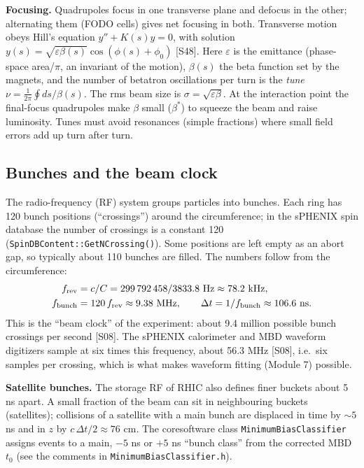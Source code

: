 \documentclass[11pt,letterpaper]{article}
\begin{document}
\textbf{Focusing.} Quadrupoles focus in one transverse plane and defocus in the other; alternating them (FODO cells) gives net
focusing in both. Transverse motion obeys Hill's equation $y''+K(s)y=0$, with solution
$y(s)=\sqrt{\varepsilon\beta(s)}\cos(\phi(s)+\phi_0)$ [S48]. Here $\varepsilon$ is the emittance (phase-space area/$\pi$, an
invariant of the motion), $\beta(s)$ the beta function set by the magnets, and the number of betatron oscillations per turn
is the \emph{tune} $\nu=\frac{1}{2\pi}\oint ds/\beta(s)$. The rms beam size is $\sigma=\sqrt{\varepsilon\beta}$. At the
interaction point the final-focus quadrupoles make $\beta$ small ($\beta^*$) to squeeze the beam and raise luminosity.
Tunes must avoid resonances (simple fractions) where small field errors add up turn after turn.

\subsection{Bunches and the beam clock}
The radio-frequency (RF) system groups particles into bunches. Each ring has 120 bunch positions (``crossings'') around
the circumference; in the sPHENIX spin database the number of crossings is a constant 120 (\texttt{SpinDBContent::GetNCrossing()}).
Some positions are left empty as an abort gap, so typically about 110 bunches are filled. The numbers follow from the circumference:
\begin{align}
f_{\rm rev}&=c/C=299\,792\,458/3833.8\ \mathrm{Hz}\approx78.2\ \mathrm{kHz},\\
f_{\rm bunch}&=120\,f_{\rm rev}\approx9.38\ \mathrm{MHz},\qquad \Delta t=1/f_{\rm bunch}\approx106.6\ \mathrm{ns}.
\end{align}
This is the ``beam clock'' of the experiment: about 9.4 million possible bunch crossings per second [S08]. The sPHENIX
calorimeter and MBD waveform digitizers sample at six times this frequency, about 56.3 MHz [S08], i.e.\ six samples per
crossing, which is what makes waveform fitting (Module 7) possible.

\textbf{Satellite bunches.} The storage RF of RHIC also defines finer buckets about 5 ns apart. A small fraction of the
beam can sit in neighbouring buckets (satellites); collisions of a satellite with a main bunch are displaced in time by
$\sim5$ ns and in $z$ by $c\,\Delta t/2\approx76$ cm. The coresoftware class \texttt{MinimumBiasClassifier} assigns events to
a main, $-5$ ns or $+5$ ns ``bunch class'' from the corrected MBD $t_0$ (see the comments in \texttt{MinimumBiasClassifier.h}).
\end{document}
